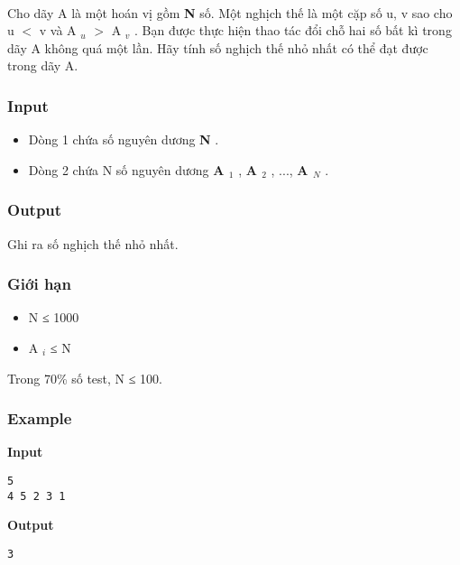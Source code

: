 

 

Cho dãy A là một hoán vị gồm \textbf{ N } số. Một nghịch thế là một cặp số u, v sao cho u $<$ v và A $_ u $ $>$ A $_ v $ . Bạn được thực hiện thao tác đổi chỗ hai số bất kì trong dãy A không quá một lần. Hãy tính số nghịch thế nhỏ nhất có thể đạt được trong dãy A.

\subsubsection{Input}
\begin{itemize}
	\item Dòng 1 chứa số nguyên dương \textbf{ N } .
	\item Dòng 2 chứa N số nguyên dương \textbf{ A $_ 1 $} , \textbf{ A $_ 2 $} , ..., \textbf{ A $_ N $} .
\end{itemize}

\subsubsection{Output}

Ghi ra số nghịch thế nhỏ nhất.

\subsubsection{Giới hạn}
\begin{itemize}
	\item N ≤ 1000
	\item A $_ i $ ≤ N
\end{itemize}

Trong 70\% số test, N ≤ 100.

\subsubsection{Example}

\textbf{Input }
\begin{verbatim}
5
4 5 2 3 1\end{verbatim}

\textbf{Output }
\begin{verbatim}
3\end{verbatim}